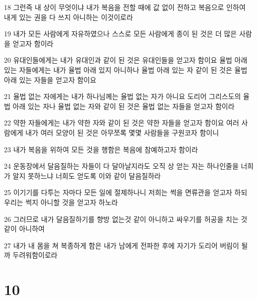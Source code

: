 \par 18 그런즉 내 상이 무엇이냐 내가 복음을 전할 때에 값 없이 전하고 복음으로 인하여 내게 있는 권을 다 쓰지 아니하는 이것이로라
\par 19 내가 모든 사람에게 자유하였으나 스스로 모든 사람에게 종이 된 것은 더 많은 사람을 얻고자 함이라
\par 20 유대인들에게는 내가 유대인과 같이 된 것은 유대인들을 얻고자 함이요 율법 아래 있는 자들에게는 내가 율법 아래 있지 아니하나 율법 아래 있는 자 같이 된 것은 율법 아래 있는 자들을 얻고자 함이요
\par 21 율법 없는 자에게는 내가 하나님께는 율법 없는 자가 아니요 도리어 그리스도의 율법 아래 있는 자나 율법 없는 자와 같이 된 것은 율법 없는 자들을 얻고자 함이라
\par 22 약한 자들에게는 내가 약한 자와 같이 된 것은 약한 자들을 얻고자 함이요 여러 사람에게 내가 여러 모양이 된 것은 아무쪼록 몇몇 사람들을 구원코자 함이니
\par 23 내가 복음을 위하여 모든 것을 행함은 복음에 참예하고자 함이라
\par 24 운동장에서 달음질하는 자들이 다 달아날지라도 오직 상 얻는 자는 하나인줄을 너희가 알지 못하느냐 너희도 얻도록 이와 같이 달음질하라
\par 25 이기기를 다투는 자마다 모든 일에 절제하나니 저희는 썩을 면류관을 얻고자 하되 우리는 썩지 아니할 것을 얻고자 하노라
\par 26 그러므로 내가 달음질하기를 향방 없는것 같이 아니하고 싸우기를 허공을 치는 것 같이 아니하여
\par 27 내가 내 몸을 쳐 복종하게 함은 내가 남에게 전파한 후에 자기가 도리어 버림이 될까 두려워함이로라

\chapter{10}

